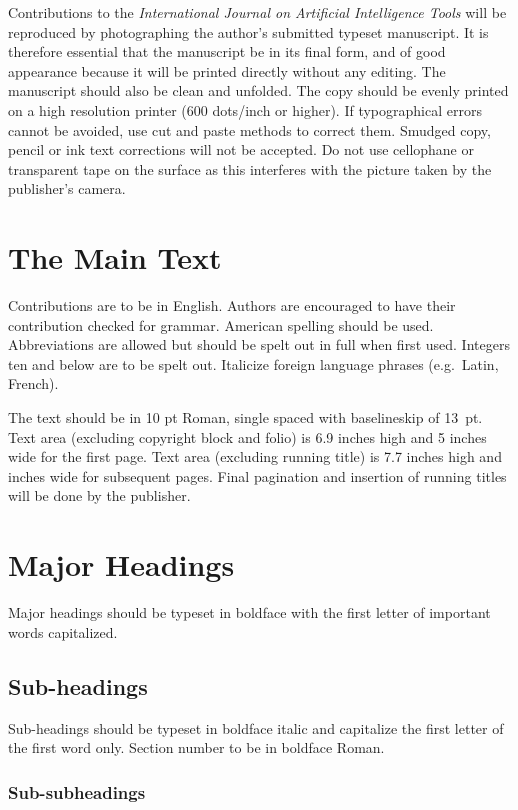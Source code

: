 \documentclass{ws-ijait}
\begin{document}
Contributions to the {\it International Journal on Artificial
Intelligence Tools} will be\break
reproduced by photographing the author's submitted typeset
manuscript. It is therefore essential that the manuscript be in its
final form, and of good appearance because it will be printed directly
without any editing. The manuscript should also be clean and
unfolded. The copy should be evenly printed on a high resolution
printer (600 dots/inch or higher).  If typographical errors cannot be
avoided, use cut and paste methods to correct them. Smudged copy,
pencil or ink text corrections will not be accepted. Do not use
cellophane or transparent tape on the surface as this interferes with
the picture taken by the publisher's camera.

\section{The Main Text}

Contributions are to be in English. Authors are encouraged to
have their contribution checked for grammar. American spelling
should be used. Abbreviations are allowed but should be spelt
out in full when first used. Integers ten and below are to be
spelt out. Italicize foreign language phrases (e.g.~Latin,
French).

The text should be in 10 pt Roman, single spaced with
baselineskip of 13~pt. Text area (excluding copyright block and folio)
is 6.9 inches high and 5 inches wide for the first page.
Text area (excluding running title) is 7.7 inches high and inches wide for subsequent pages.  Final pagination and
insertion of running titles will be done by the publisher.

\section{Major Headings}

Major headings should be typeset in boldface with the first
letter of important words capitalized.

\subsection{Sub-headings}

Sub-headings should be typeset in boldface italic and capitalize
the first letter of the first word only. Section number to be in
boldface Roman.

\subsubsection{Sub-subheadings}
\end{document}
